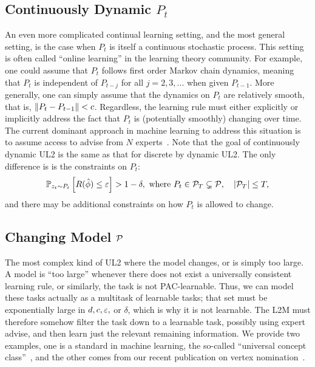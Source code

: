 \documentclass{article}
\begin{document}
\subsection{Continuously Dynamic $P_t$}
\label{sec:smooth}

An even more complicated continual learning setting, and the most general setting, is the case when $P_t$ is itself a continuous stochastic process.  This setting is often called ``online learning'' in the learning theory community. For example, one could assume that $P_t$ follows  first order Markov chain dynamics, meaning that $P_t$ is independent of $P_{t-j}$  for all $j=2,3,...$ when given $P_{t-1}$.  More generally, one can simply assume that the dynamics on $P_t$ are relatively smooth, that is, $\left \lVert P_t - P_{t-1} \right \rVert < c$.  Regardless, the learning rule must either explicitly or implicitly address the fact that $P_t$ is (potentially smoothly) changing over time.  The current dominant approach in machine learning to address this situation is to assume access to advise from $N$ experts~\cite{Mohri2012}. Note that the goal of continuously dynamic UL2 is the same as that for discrete by dynamic UL2.  The only difference is is the constraints on $P_t$:
\begin{align} \label{eq:online}        
    \mathbb{P}_{ z_t \sim P_t} \left[R(\hat{\phi})  \leq \varepsilon \right] > 1 - \delta, \text{ where } P_t \in \mathcal{P}_T \subsetneq \mathcal{P}, \quad |\mathcal{P}_T| \leq T,
\end{align}
and there may be additional constraints on how $P_t$ is allowed to change.




\subsection{Changing Model $\mathcal{P}$}

The most complex kind of UL2 where the model changes, or is simply too large. A model is ``too large'' whenever there does not exist a universally consistent learning rule, or similarly, the task is not PAC-learnable. Thus, we can model these tasks actually as a multitask of learnable tasks;  that set must be exponentially large in $d,c,\varepsilon,$ or $\delta$, which is why it is not learnable.  The L2M must therefore somehow filter the task down to a learnable task, possibly using expert advise, and then learn just the relevant remaining information.  We provide two examples, one is a standard in machine learning, the so-called ``universal concept class''~\cite{Mohri2012}, and the other comes from our recent publication on vertex nomination~\cite{Lyzinski2017}.  
\end{document}
